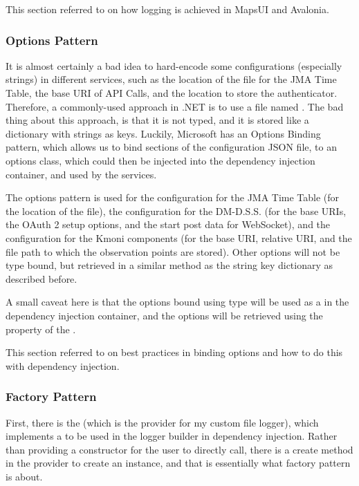 This section referred to \autocite{mapsui-logging, avalonia-logging} on how logging is achieved in MapsUI and Avalonia.

\subsubsection{Options Pattern}

It is almost certainly a bad idea to hard-encode some configurations (especially strings) in different services, such as the location of the file for the JMA Time Table, the base URI of API Calls, and the location to store the authenticator. Therefore, a commonly-used approach in .NET is to use a file named . The bad thing about this approach, is that it is not typed, and it is stored like a dictionary with strings as keys. Luckily, Microsoft has an Options Binding pattern, which allows us to bind sections of the configuration JSON file, to an options class, which could then be injected into the dependency injection container, and used by the services.

The options pattern is used for the configuration for the JMA Time Table (for the location of the file), the configuration for the DM-D.S.S. (for the base URIs, the OAuth 2 setup options, and the start post data for WebSocket), and the configuration for the Kmoni components (for the base URI, relative URI, and the file path to which the observation points are stored). Other options will not be type bound, but retrieved in a similar method as the string key dictionary as described before.

A small caveat here is that the options bound using type  will be used as a  in the dependency injection container, and the options will be retrieved using the  property of the .

This section referred to \autocite{dotnet-tutorial-configuration} on best practices in binding options and how to do this with dependency injection.

\subsubsection{Factory Pattern}

First, there is the  (which is the provider for my custom file logger), which implements a  to be used in the logger builder in dependency injection. Rather than providing a constructor for the user to directly call, there is a create method in the provider to create an instance, and that is essentially what factory pattern is about.

